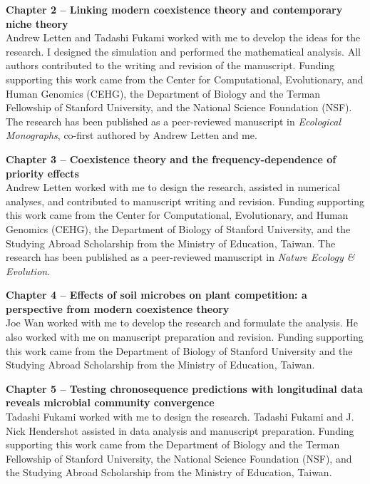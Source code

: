 \noindent \textbf{Chapter 2 -- Linking modern coexistence theory and contemporary niche theory}\\
\noindent Andrew Letten and Tadashi Fukami worked with me to develop the ideas for the research. I designed the simulation and performed the mathematical analysis. All authors contributed to the writing and revision of the manuscript. Funding supporting this work came from the Center for Computational, Evolutionary, and Human Genomics (CEHG), the Department of Biology and the Terman Fellowship of Stanford University, and the National Science Foundation (NSF). The research has been published as a peer-reviewed manuscript in \textit{Ecological Monographs}, co-first authored by Andrew Letten and me.
\bigskip


\noindent \textbf{Chapter 3 -- Coexistence theory and the frequency-dependence of priority effects}\\
\noindent Andrew Letten worked with me to design the research, assisted in numerical analyses, and contributed to manuscript writing and revision. Funding supporting this work came from the Center for Computational, Evolutionary, and Human Genomics (CEHG), the Department of Biology of Stanford University, and the Studying Abroad Scholarship from the Ministry of Education, Taiwan. The research has been published as a peer-reviewed manuscript in \textit{Nature Ecology \& Evolution}.
\bigskip


\noindent \textbf{Chapter 4 -- Effects of soil microbes on plant competition: a perspective from modern coexistence theory}\\
\noindent Joe Wan worked with me to develop the research and formulate the analysis. He also worked with me on manuscript preparation and revision. Funding supporting this work came from the Department of Biology of Stanford University and the Studying Abroad Scholarship from the Ministry of Education, Taiwan. 
\bigskip


\noindent \textbf{Chapter 5 -- Testing chronosequence predictions with longitudinal data reveals microbial community convergence}\\
\noindent Tadashi Fukami worked with me to design the research. Tadashi Fukami and J. Nick Hendershot assisted in data analysis and manuscript preparation. Funding supporting this work came from the Department of Biology and the Terman Fellowship of Stanford University, the National Science Foundation (NSF), and the Studying Abroad Scholarship from the Ministry of Education, Taiwan.
\bigskip


